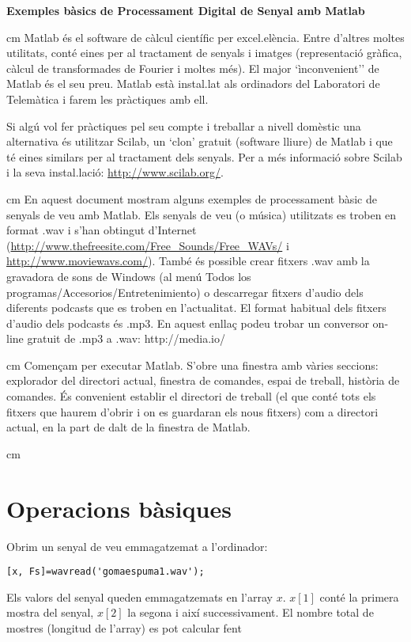 \documentclass{article}
\begin{document}
\textbf{\Large Exemples bàsics de Processament Digital de Senyal amb Matlab}

 cm
Matlab és el software de càlcul científic per excel.elència. Entre d'altres moltes utilitats, 
conté eines per al tractament de senyals i imatges (representació gràfica, càlcul de transformades de Fourier i moltes més).
El major `ìnconvenient'' de Matlab és el seu preu. Matlab està instal.lat als ordinadors del Laboratori
de Telemàtica i farem les pràctiques amb ell. 

Si algú vol fer pràctiques pel seu compte i treballar a nivell domèstic una alternativa és utilitzar Scilab, un `clon' 
gratuit (software lliure) de Matlab i que té eines similars per al tractament dels senyals.
Per a més informació sobre Scilab i la seva instal.lació: 
\url{http://www.scilab.org/}.

 cm
En aquest document mostram alguns exemples de processament bàsic de senyals de veu
amb Matlab. Els senyals de veu (o música) utilitzats es troben en format .wav
i s'han obtingut d'Internet (\url{http://www.thefreesite.com/Free_Sounds/Free_WAVs/}
i \url{http://www.moviewavs.com/}). També és possible crear fitxers .wav amb
la gravadora de sons de Windows (al menú Todos los programas/Accesorios/Entretenimiento)
o descarregar fitxers d'audio dels diferents podcasts que es troben en l'actualitat.
El format habitual dels fitxers d'audio dels podcasts és .mp3. En aquest enllaç podeu trobar un conversor
on-line gratuit de .mp3 a .wav:  http://media.io/


 cm
Començam per executar Matlab.  S'obre una finestra amb vàries seccions: 
explorador del directori actual, finestra de comandes, espai de treball, història de comandes.
És convenient establir el directori de treball (el que conté tots els fitxers que haurem d'obrir i on es guardaran els nous fitxers)
com a directori actual, en la part de dalt de la finestra de Matlab.

 cm
\noindent
\section{Operacions bàsiques}

Obrim un senyal de veu emmagatzemat a l'ordinador:

\begin{verbatim}
[x, Fs]=wavread('gomaespuma1.wav');
\end{verbatim}

Els valors del senyal queden emmagatzemats en l'array $x$.
$x[1]$ conté la primera mostra del senyal, $x[2]$ la segona
i així successivament. El nombre total de mostres (longitud de l'array)
es pot calcular fent
\end{document}
